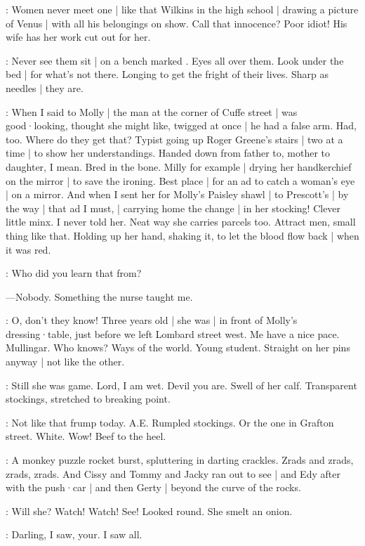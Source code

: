 \BloomHist:
Women never meet one |
like that Wilkins in the high school |
drawing a picture of Venus |
with all his belongings on show.%
Call that innocence?
Poor idiot!
His wife has her work cut out for her.

\BloomAbstract:
Never see them sit |
on a bench marked .
Eyes all over them.
Look under the bed |
for what's not there.
Longing to get the fright of their lives.
Sharp as needles |
they are.

\BloomHist:
When I said to Molly |
the man at the corner of Cuffe street |
was good·looking,
thought she might like,
twigged at once |
he had a false arm.
Had,
too.
Where do they get that?
Typist going up Roger Greene's stairs |
two at a time |
to show her understandings.
Handed down from father to,
mother to daughter,
I mean.
Bred in the bone.
Milly for example |
drying her handkerchief
on the mirror |
to save the ironing.
Best place |
for an ad to catch a woman's eye |
on a mirror.%
And when I sent her
for Molly's Paisley shawl |
to Prescott's |
by the way |
that ad I must, |
carrying home the change |
in her stocking!
Clever little minx.
I never told her.
Neat way she carries parcels too.
Attract men,
small thing like that.
Holding up her hand,
shaking it,
to let the blood flow back |
when it was red.

\BloomOther:
Who did you learn that from?

---Nobody.
Something the nurse taught me.

\BloomHist:
O,
don't they know!
Three years old |
she was |
in front of Molly's dressing·table,
just before we left Lombard street west.
Me have a nice pace.
Mullingar.
Who knows?
Ways of the world.
Young student.
Straight on her pins anyway |
not like the other.

\BloomCurrent:
Still she was game.
Lord,
I am wet.
Devil you are.
Swell of her calf.
Transparent stockings,
stretched to breaking point.%

\BloomCurrent:
Not like that frump today.
A.E.
Rumpled stockings.
Or the one in Grafton street.
White.
Wow!
Beef to the heel.

:
A monkey puzzle rocket burst,
spluttering in darting crackles.
Zrads and zrads,
zrads,
zrads.
And Cissy and Tommy and Jacky ran out to see |
and Edy after with the push·car |
and then Gerty |
beyond the curve of the rocks.

\BloomInt:
Will she?
Watch!
Watch!
See!
Looked round.
She smelt an onion.

\BloomAbstract:
Darling,
I saw,
your.
I saw all.

